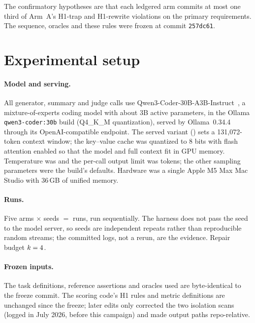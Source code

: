 \documentclass[11pt]{article}
\begin{document}
The confirmatory hypotheses are that each ledgered arm commits at most one third
of Arm~A's H1-trap and H1-rewrite violations on the primary requirements. The
sequence, oracles and these rules were frozen at commit \texttt{257dc61}.

\section{Experimental setup}
\label{sec:setup}

\paragraph{Model and serving.} All generator, summary and judge calls use
Qwen3-Coder-30B-A3B-Instruct~\cite{qwen3}, a mixture-of-experts coding model
with about 3B active parameters, in the Ollama \texttt{qwen3-coder:30b} build
(Q4\_K\_M quantization), served by Ollama~0.34.4 through its
OpenAI-compatible endpoint. The served variant (\texttt{\NModel}) sets a
131{,}072-token context window; the key--value cache was quantized to 8 bits
with flash attention enabled so that the model and full context fit in GPU
memory. Temperature was \NTemperature{} and the per-call output limit was
\NMaxTokens{} tokens; the other sampling parameters were the build's
defaults. Hardware was a single Apple M5 Max Mac Studio with 36\,GB of unified
memory.

\paragraph{Runs.} Five arms $\times$ \NSeedsPerArm{} seeds $=$ \NNRuns{}
runs, run sequentially. The harness does not pass the seed to the model
server, so seeds are independent repeats rather than reproducible random
streams; the committed logs, not a rerun, are the evidence. Repair budget
$k=4$.

\paragraph{Frozen inputs.} The task definitions, reference assertions and
oracles used are byte-identical to the freeze commit. The scoring code's H1
rules and metric definitions are unchanged since the freeze; later edits only
corrected the two isolation scans (logged in July 2026, before this campaign)
and made output paths repo-relative.
\end{document}
